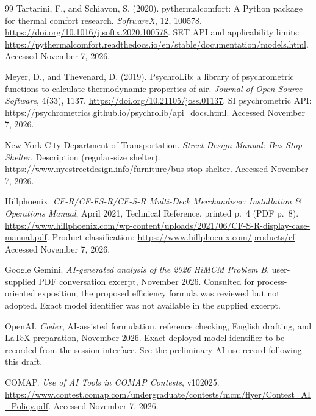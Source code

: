 \documentclass[12pt]{article}
\begin{document}
\begin{thebibliography}{99}
Tartarini, F., and Schiavon, S. (2020).
pythermalcomfort: A Python package for thermal comfort research.
\emph{SoftwareX}, 12, 100578.
\url{https://doi.org/10.1016/j.softx.2020.100578}.
SET API and applicability limits:
\url{https://pythermalcomfort.readthedocs.io/en/stable/documentation/models.html}.
Accessed November 7, 2026.

Meyer, D., and Thevenard, D. (2019).
PsychroLib: a library of psychrometric functions to calculate thermodynamic properties of air.
\emph{Journal of Open Source Software}, 4(33), 1137.
\url{https://doi.org/10.21105/joss.01137}.
SI psychrometric API:
\url{https://psychrometrics.github.io/psychrolib/api_docs.html}.
Accessed November 7, 2026.

New York City Department of Transportation.
\emph{Street Design Manual: Bus Stop Shelter}, Description (regular-size shelter).
\url{https://www.nycstreetdesign.info/furniture/bus-stop-shelter}.
Accessed November 7, 2026.

Hillphoenix. \emph{CF-R/CF-FS-R/CF-S-R Multi-Deck Merchandiser: Installation \& Operations Manual}, April 2021, Technical Reference, printed p.~4 (PDF p.~8).
\url{https://www.hillphoenix.com/wp-content/uploads/2021/06/CF-S-R-display-case-manual.pdf}.
Product classification: \url{https://www.hillphoenix.com/products/cf}.
Accessed November 7, 2026.

Google Gemini. \emph{AI-generated analysis of the 2026 HiMCM Problem B},
user-supplied PDF conversation excerpt, November 2026.
Consulted for process-oriented exposition; the proposed efficiency formula was
reviewed but not adopted. Exact model identifier was not available in the supplied excerpt.

OpenAI. \emph{Codex}, AI-assisted formulation, reference checking,
English drafting, and LaTeX preparation, November 2026.
Exact deployed model identifier to be recorded from the session interface.
See the preliminary AI-use record following this draft.

COMAP. \emph{Use of AI Tools in COMAP Contests}, v102025.
\url{https://www.contest.comap.com/undergraduate/contests/mcm/flyer/Contest_AI_Policy.pdf}.
Accessed November 7, 2026.
\end{thebibliography}

\clearpage
{}
{}
\end{document}
